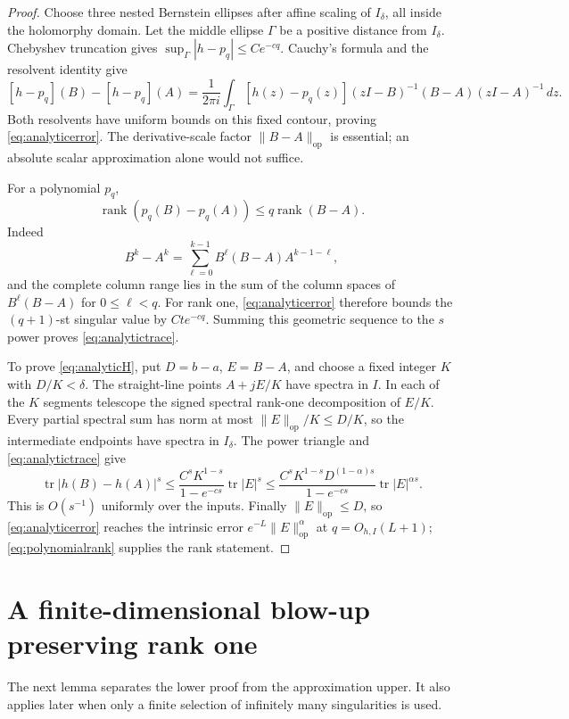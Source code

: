 \documentclass[11pt]{article}
\numberwithin{equation}{section}
\newcommand{\tr}{\operatorname{tr}}
\newcommand{\rank}{\operatorname{rank}}
\newcommand{\op}{\mathrm{op}}
\begin{document}
\begin{proof}
Choose three nested Bernstein ellipses after affine scaling of
$I_\delta$, all inside the holomorphy domain. Let the middle ellipse
$\Gamma$ be a positive distance from $I_\delta$. Chebyshev truncation
gives $\sup_\Gamma|h-p_q|\le C e^{-cq}$.
Cauchy's formula and the resolvent identity give
\[
 [h-p_q](B)-[h-p_q](A)
 =\frac1{2\pi i}\int_\Gamma [h(z)-p_q(z)]
       (zI-B)^{-1}(B-A)(zI-A)^{-1}\,dz.
\]
Both resolvents have uniform bounds on this fixed contour, proving
\eqref{eq:analyticerror}. The derivative-scale factor $\|B-A\|_{\op}$
is essential; an absolute scalar approximation alone would not suffice.

For a polynomial $p_q$,
\begin{equation}\label{eq:polynomialrank}
 \rank(p_q(B)-p_q(A))\le q\rank(B-A).
\end{equation}
Indeed
\[
 B^k-A^k=\sum_{\ell=0}^{k-1}B^\ell(B-A)A^{k-1-\ell},
\]
and the complete column range lies in the sum of the column spaces of
$B^\ell(B-A)$ for $0\le\ell<q$.
For rank one, \eqref{eq:analyticerror} therefore bounds the $(q+1)$-st
singular value by $Ct e^{-cq}$. Summing this geometric sequence to
the $s$ power proves \eqref{eq:analytictrace}.

To prove \eqref{eq:analyticH}, put $D=b-a$, $E=B-A$, and choose a fixed
integer $K$ with $D/K<\delta$. The straight-line points $A+jE/K$ have
spectra in $I$. In each of the $K$ segments telescope the signed
spectral rank-one decomposition of $E/K$. Every partial spectral sum
has norm at most $\|E\|_{\op}/K\le D/K$, so the intermediate endpoints
have spectra in $I_\delta$. The power triangle and
\eqref{eq:analytictrace} give
\[
 \tr|h(B)-h(A)|^s
 \le\frac{C^s K^{1-s}}{1-e^{-cs}}\tr|E|^s
 \le\frac{C^s K^{1-s}D^{(1-\alpha)s}}{1-e^{-cs}}
                                            \tr|E|^{\alpha s}.
\]
This is $O(s^{-1})$ uniformly over the inputs.
Finally $\|E\|_{\op}\le D$, so \eqref{eq:analyticerror} reaches the
intrinsic error $e^{-L}\|E\|_{\op}^{\alpha}$ at $q=O_{h,I}(L+1)$;
\eqref{eq:polynomialrank} supplies the rank statement.
\end{proof}

\section{A finite-dimensional blow-up preserving rank one}

The next lemma separates the lower proof from the approximation upper.
It also applies later when only a finite selection of infinitely many
singularities is used.
\end{document}
